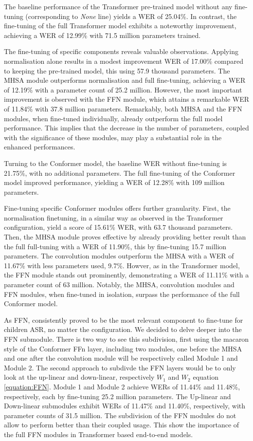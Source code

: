 The baseline performance of the Transformer pre-trained model without any fine-tuning (corresponding to \textit{None} line) yields a WER of 25.04\%. In contrast, the fine-tuning of the full Transformer model exhibits a noteworthy improvement, achieving a WER of 12.99\% with 71.5 million parameters trained.

The fine-tuning of specific components reveals valuable observations. Applying normalisation alone results in a modest improvement WER of 17.00\% compared to keeping the pre-trained model, this using 57.9 thousand parameters. The MHSA module outperforms normalisation and full fine-tuning, achieving a WER of 12.19\% with a parameter count of 25.2 million. However, the most important improvement is observed with the FFN module, which attains a remarkable WER of 11.84\% with 37.8 million parameters. Remarkably, both MHSA and the FFN modules, when fine-tuned individually, already outperform the full model performance. This implies that the decrease in the number of parameters, coupled with the significance of these modules, may play a substantial role in the enhanced performances.

Turning to the Conformer model, the baseline WER without fine-tuning is 21.75\%, with no additional parameters. The full fine-tuning of the Conformer model improved performance, yielding a WER of 12.28\% with 109 million parameters.

Fine-tuning specific Conformer modules offers further granularity. First, the normalisation finetuning, in a similar way as observed in the Transformer configuration, yield a score of 15.61\% WER, with 63.7 thousand parameters. Then,  the MHSA module proves effective by already providing better result than the full full-tuning with a WER of 11.90\%, this by fine-tuning 15.7 million parameters. The convolution modules outperform the MHSA with a WER of 11.67\% with less parameters used, 9.7\%. Howver, as in the Transformer model, the FFN module stands out prominently, demonstrating a WER of 11.11\% with a parameter count of 63 million. Notably, the MHSA, convolution modules and FFN modules, when fine-tuned in isolation, surpass the performance of the full Conformer model.

As FFN, consistently proved to be the most relevant component to fine-tune for children ASR, no matter the configuration. We decided to delve deeper into the FFN submodule. There is two way to see this subdivision, first using the macaron style of the Conformer FFn layer, including two modules, one before the MHSA and one after the convolution module will be respectively called Module 1 and Module 2. The second approach to subdivde the FFN layers would be to only look at the up-linear and down-linear, respectively $W_1$ and $W_2$ equation \ref{equation:FFN}. Module 1 and Module 2 achieve WERs of 11.44\% and 11.48\%, respectively, each by fine-tuning 25.2 million parameters. The Up-linear and Down-linear  submodules exhibit WERs of 11.47\% and 11.40\%, respectively, with parameter counts of 31.5 million. The subdivision of the FFN modules do not allow to perform better than their coupled usage. This show the importance of the full FFN modules in Transformer based end-to-end models. 

